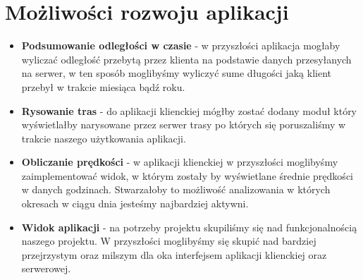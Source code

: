 \documentclass{article}
\begin{document}
\section{Możliwości rozwoju aplikacji}
\begin{itemize}
	\item \textbf{Podsumowanie odległości w czasie} - w przyszłości aplikacja mogłaby wyliczać odległość przebytą przez klienta na podstawie danych przesyłanych na serwer, w ten sposób moglibyśmy wyliczyć sume długości jaką klient przebył w trakcie miesiąca bądź roku.
	
	\item \textbf{Rysowanie tras} - do aplikacji klienckiej mógłby zostać dodany moduł który wyświetlałby narysowane przez serwer trasy po których się poruszaliśmy w trakcie naszego użytkowania aplikacji.
	
	\item \textbf{Obliczanie prędkości} - w aplikacji klienckiej w przyszłości moglibyśmy zaimplementować widok, w którym zostały by wyświetlane średnie prędkości w danych godzinach. Stwarzałoby to możliwość analizowania w których okresach w ciągu dnia jesteśmy najbardziej aktywni.
	
	\item \textbf{Widok aplikacji} - na potrzeby projektu skupiliśmy się nad funkcjonalnością naszego projektu. W przyszłości moglibyśmy się skupić nad bardziej przejrzystym oraz milszym dla oka interfejsem aplikacji klienckiej oraz serwerowej.
	
\end{itemize}
\end{document}
